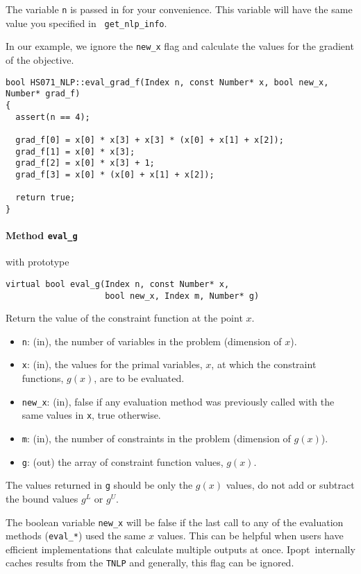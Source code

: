 \documentclass[10pt]{article}
\newcommand{\Ipopt}{{\sc Ipopt}}
\begin{document}
The variable {\tt n} is passed in for your convenience. This
variable will have the same value you specified in {\tt
get\_nlp\_info}.

In our example, we ignore the {\tt new\_x} flag and calculate the
values for the gradient of the objective.

\begin{footnotesize}
\begin{verbatim}
bool HS071_NLP::eval_grad_f(Index n, const Number* x, bool new_x, Number* grad_f)
{
  assert(n == 4);

  grad_f[0] = x[0] * x[3] + x[3] * (x[0] + x[1] + x[2]);
  grad_f[1] = x[0] * x[3];
  grad_f[2] = x[0] * x[3] + 1;
  grad_f[3] = x[0] * (x[0] + x[1] + x[2]);

  return true;
}
\end{verbatim}
\end{footnotesize}

\paragraph{Method {\texttt{eval\_g}}} with prototype
\begin{verbatim}
virtual bool eval_g(Index n, const Number* x, 
                    bool new_x, Index m, Number* g)
\end{verbatim}
Return the value of the constraint function at the point $x$.
\begin{itemize}
\item {\tt n}: (in), the number of variables in the problem (dimension of $x$). 
\item {\tt x}: (in), the values for the primal variables, $x$, at
  which the constraint functions,
  $g(x)$, are to be evaluated.
\item {\tt new\_x}: (in), false if any evaluation method was previously called 
        with the same values in {\tt x}, true otherwise.
\item {\tt m}: (in), the number of constraints in the problem (dimension of $g(x)$).
\item {\tt g}: (out) the array of constraint function values, $g(x)$.
\end{itemize}

The values returned in {\tt g} should be only the $g(x)$ values, 
do not add or subtract the bound values $g^L$ or $g^U$.

The boolean variable {\tt new\_x} will be false if the last call to
any of the evaluation methods ({\tt eval\_*}) used the same $x$
values. This can be helpful when users have efficient implementations
that calculate multiple outputs at once. \Ipopt\ internally caches
results from the {\tt TNLP} and generally, this flag can be ignored.
\end{document}
